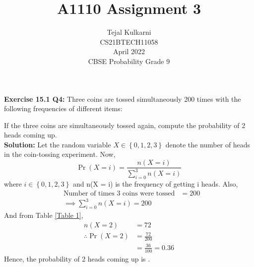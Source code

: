 \documentclass[journal,12pt,two column]{IEEEtran}
\title{A1110 Assignment 3 }
\author{Tejal Kulkarni \\ CS21BTECH11058 \\\vspace*{20pt} April 2022 \\ CBSE Probability Grade 9 }
\begin{document}
\newcommand{\solution}{\noindent \textbf{Solution: }}
\providecommand{\pr}[1]{\ensuremath{\Pr\left(#1\right)}}
\providecommand{\qfunc}[1]{\ensuremath{Q\left(#1\right)}}
\providecommand{\sbrak}[1]{\ensuremath{{}\left[#1\right]}}
\providecommand{\lsbrak}[1]{\ensuremath{{}\left[#1\right.}}
\providecommand{\rsbrak}[1]{\ensuremath{{}\left.#1\right]}}
\providecommand{\brak}[1]{\ensuremath{\left(#1\right)}}
\providecommand{\lbrak}[1]{\ensuremath{\left(#1\right.}}
\providecommand{\rbrak}[1]{\ensuremath{\left.#1\right)}}
\providecommand{\cbrak}[1]{\ensuremath{\left\{#1\right\}}}
\providecommand{\lcbrak}[1]{\ensuremath{\left\{#1\right.}}
\providecommand{\rcbrak}[1]{\ensuremath{\left.#1\right\}}}
\renewcommand{\thetable}{\arabic{table}} 

\maketitle

\textbf{Exercise 15.1 Q4:} Three coins are tossed simultaneously 200 times with the following frequencies of different items:
\begin{table}[ht!]
    \centering
    
    \caption{}
    \label{Table 1}
\end{table}

If the three coins are simultaneously tossed again, compute the probability of 2 heads coming up.\\ 
\solution
Let the random variable $X \in \cbrak{0,1,2,3}$ denote the number of heads in the coin-tossing experiment. Now, 
\begin{equation}
   \pr{X = i} = \dfrac{n(X = i)}{\sum_{i=0}^{3} n(X = i) }
\end{equation}
where $i \in \cbrak{0,1,2,3}$ and n(X = i) is the frequency of getting i heads. Also,
\begin{align}
&\text{Number of times 3 coins were tossed} &= 200\\ 
&\implies  \sum_{i=0}^{3} n(X = i) = 200
\end{align}
And from Table \ref{Table 1}, 
\begin{align}
                n(X = 2) &= 72 \\
\therefore    \pr{X = 2} &= \frac{72}{200} \\
                         &= \frac{36}{100} = 0.36 
\end{align}
Hence, the probability of 2 heads coming up is .
\end{document}
